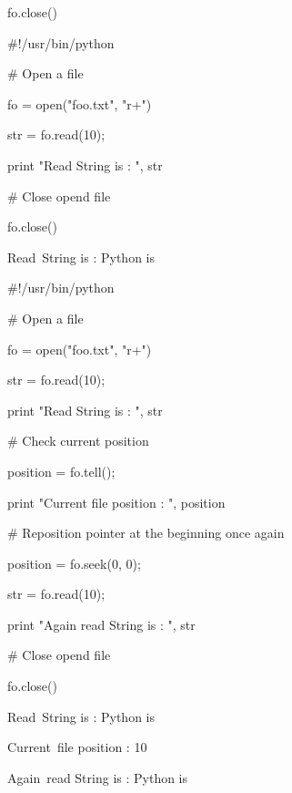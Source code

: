 \noindent 
fo.close() \par
\noindent 
$  \#  $!/usr/bin/python \par
\vspace{12pt}
\noindent 
$  \#  $ Open a file \par
\noindent 
fo = open("foo.txt", "r+") \par
\noindent 
str = fo.read(10); \par
\noindent 
print "Read String is : ", str \par
\vspace{12pt}
\noindent 
$  \#  $ Close opend file \par
\noindent 
fo.close() \par
\vspace{12pt}
\noindent 
Read~String is :  Python is \par
\vspace{12pt}
\noindent 
$  \#  $!/usr/bin/python \par
\vspace{12pt}
\noindent 
$  \#  $ Open a file \par
\noindent 
fo = open("foo.txt", "r+") \par
\noindent 
str = fo.read(10); \par
\noindent 
print "Read String is : ", str \par
\vspace{12pt}
\noindent 
$  \#  $ Check current position \par
\noindent 
position = fo.tell(); \par
\noindent 
print "Current file position : ", position \par
\vspace{12pt}
\noindent 
$  \#  $ Reposition pointer at the beginning once again \par
\noindent 
position = fo.seek(0, 0); \par
\noindent 
str = fo.read(10); \par
\noindent 
print "Again read String is : ", str \par
\noindent 
$  \#  $ Close opend file \par
\noindent 
fo.close() \par
\vspace{12pt}
\noindent 
Read~String is :  Python is \par
\noindent 
Current~file position :  10 \par
\noindent 
Again~read String is :  Python is \par
\vspace{12pt}
